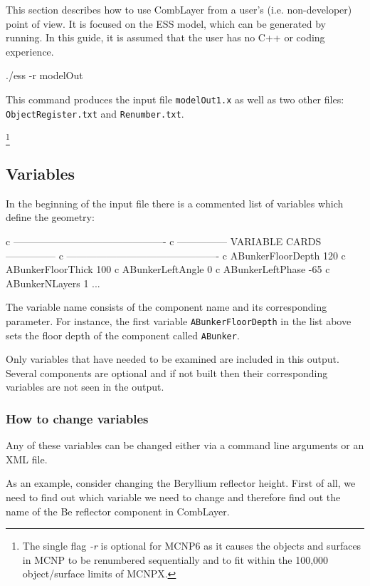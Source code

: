 This section describes how to use CombLayer from a user's (i.e. non-developer) point of view.
It is focused on the ESS model, which can be generated by running. In this guide, it is assumed that
the user has no C++ or coding experience.

\begin{bash}
  ./ess -r modelOut
\end{bash}

This command produces the \mcnp input file {\tt modelOut1.x} as well as two other files: {\tt ObjectRegister.txt} and {\tt Renumber.txt}.

\footnote{The single flag {\it -r} is optional for MCNP6 as it causes the objects and surfaces in MCNP to be renumbered sequentially and
to fit within the 100,000 object/surface limits of MCNPX.}

\subsection{Variables}
In the beginning of the input file there is a commented list of variables which define the geometry:

\begin{deck}
 c ----------------------------------------------
 c --------------- VARIABLE CARDS ---------------
 c ----------------------------------------------
 c ABunkerFloorDepth 120
 c ABunkerFloorThick 100
 c ABunkerLeftAngle 0
 c ABunkerLeftPhase -65
 c ABunkerNLayers 1
 ...
\end{deck}

The variable name consists of the component name and its corresponding parameter. For instance,
the first variable {\tt ABunkerFloorDepth} in the list above sets the floor depth of the component called {\tt ABunker}.

Only variables that have needed to be examined are included in this output. Several components are optional and if not built then
their corresponding variables are not seen in the output.


\subsubsection{How to change variables}
Any of these variables can be changed either via a command line arguments or an XML file.

As an example, consider changing the Beryllium reflector height.
First of all, we need to find out which variable we need to change and therefore find out the name of the Be reflector
component in CombLayer.

